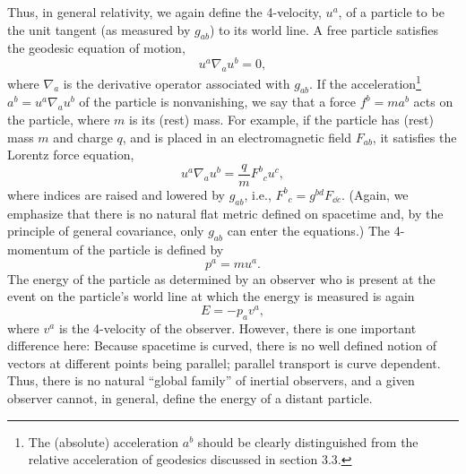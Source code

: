 Thus, in general relativity, we again define the 4-velocity, \(u^a\), of a
particle to be the unit tangent (as measured by \(g_{ab}\)) to its world line. A
free particle satisfies the geodesic equation of motion,
\begin{equation}
  u^a\nabla_au^b=0 ,
  \tag{4.3.1}\label{eq:4.3.1}
\end{equation}
where \(\nabla_a\) is the derivative operator associated with \(g_{ab}\). If
the acceleration\footnote{The (absolute) acceleration \(a^b\) should be clearly
distinguished from the relative acceleration of geodesics discussed in section 3.3.}
\(a^b=u^a\nabla_au^b\) of the particle is nonvanishing, we say that a force
\(f^b=ma^b\) acts on the particle, where \(m\) is its (rest) mass. For
example, if the particle has (rest) mass \(m\) and charge \(q\), and is placed
in an electromagnetic field \(F_{ab}\), it satisfies the Lorentz force equation,
\begin{equation}
  u^a\nabla_au^b=\frac{q}{m}F^b{}_cu^c ,
  \tag{4.3.2}\label{eq:4.3.2}
\end{equation}
where indices are raised and lowered by \(g_{ab}\), i.e.,
\(F^b{}_c=g^{bd}F_{\dd c}\). (Again, we emphasize that there is no natural flat
metric defined on spacetime and, by the principle of general covariance, only
\(g_{ab}\) can enter the equations.) The 4-momentum of the particle is defined
by
\begin{equation}
  p^a=mu^a .
  \tag{4.3.3}\label{eq:4.3.3}
\end{equation}
The energy of the particle as determined by an observer who is present at the
event on the particle's world line at which the energy is measured is again
\begin{equation}
  E=-p_av^a ,
  \tag{4.3.4}\label{eq:4.3.4}
\end{equation}
where \(v^a\) is the 4-velocity of the observer. However, there is one important
difference here: Because spacetime is curved, there is no well defined notion of
vectors at different points being parallel; parallel transport is curve dependent.
Thus, there is no natural \textquotedblleft global family\textquotedblright{} of
inertial observers, and a given observer cannot, in general, define the energy of a
distant particle.

